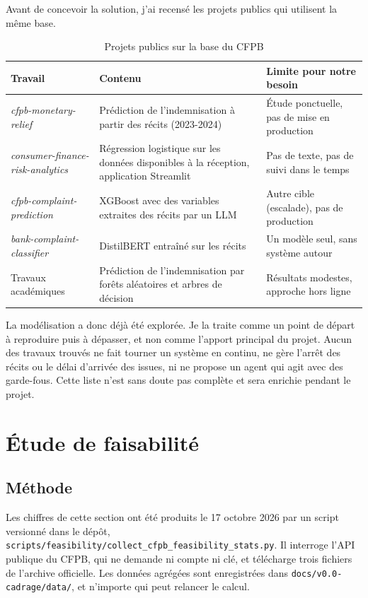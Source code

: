\documentclass[11pt,a4paper]{article}
\begin{document}
Avant de concevoir la solution, j'ai recensé les projets publics qui utilisent la même base.

\begin{table}[H]
\centering\small
\begin{tabularx}{\linewidth}{@{}l Y Y@{}}
\toprule
Travail & Contenu & Limite pour notre besoin \\
\midrule
\emph{cfpb-monetary-relief} \cite{gh-kingston} & Prédiction de l'indemnisation à partir des récits (2023-2024) & Étude ponctuelle, pas de mise en production \\
\emph{consumer-finance-risk-analytics} \cite{gh-jskjames} & Régression logistique sur les données disponibles à la réception, application Streamlit & Pas de texte, pas de suivi dans le temps \\
\emph{cfpb-complaint-prediction} \cite{gh-ruhel} & XGBoost avec des variables extraites des récits par un LLM & Autre cible (escalade), pas de production \\
\emph{bank-complaint-classifier} \cite{hf-rakshith} & DistilBERT entraîné sur les récits & Un modèle seul, sans système autour \\
Travaux académiques \cite{arxiv2024} & Prédiction de l'indemnisation par forêts aléatoires et arbres de décision & Résultats modestes, approche hors ligne \\
\bottomrule
\end{tabularx}
\caption{Projets publics sur la base du CFPB}
\end{table}

La modélisation a donc déjà été explorée. Je la traite comme un point de départ à reproduire puis à dépasser, et non comme l'apport principal du projet. Aucun des travaux trouvés ne fait tourner un système en continu, ne gère l'arrêt des récits ou le délai d'arrivée des issues, ni ne propose un agent qui agit avec des garde-fous. Cette liste n'est sans doute pas complète et sera enrichie pendant le projet.

\section{Étude de faisabilité}
\label{sec:faisabilite}

\subsection{Méthode}

Les chiffres de cette section ont été produits le 17 octobre 2026 par un script versionné dans le dépôt, \nolinkurl{scripts/feasibility/collect_cfpb_feasibility_stats.py}. Il interroge l'API publique du CFPB, qui ne demande ni compte ni clé, et télécharge trois fichiers de l'archive officielle. Les données agrégées sont enregistrées dans \nolinkurl{docs/v0.0-cadrage/data/}, et n'importe qui peut relancer le calcul.
\end{document}
